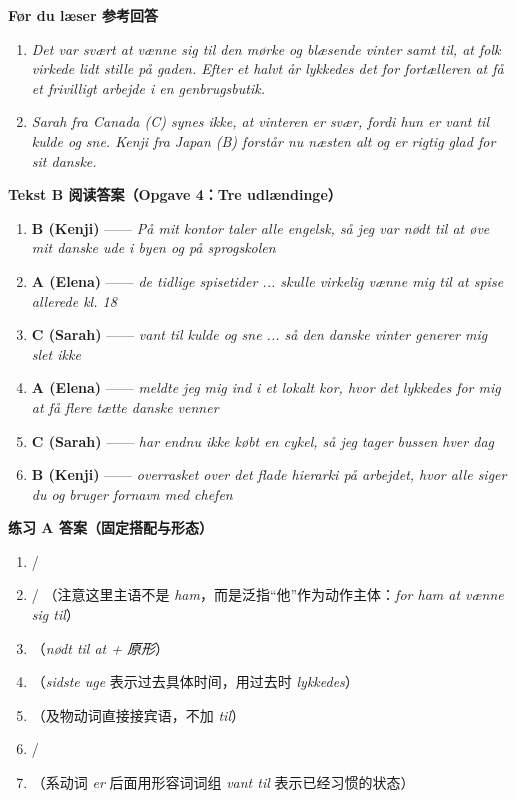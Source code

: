 \begin{answerbox}
\textbf{Før du læser 参考回答}
\begin{enumerate}
  \item \textit{Det var svært at vænne sig til den mørke og blæsende vinter samt til, at folk virkede lidt stille på gaden. Efter et halvt år lykkedes det for fortælleren at få et frivilligt arbejde i en genbrugsbutik.}
  \item \textit{Sarah fra Canada (C) synes ikke, at vinteren er svær, fordi hun er vant til kulde og sne. Kenji fra Japan (B) forstår nu næsten alt og er rigtig glad for sit danske.}
\end{enumerate}

\textbf{Tekst B 阅读答案（Opgave 4：Tre udlændinge）}
\begin{enumerate}
  \item \textbf{B (Kenji)} —— \textit{På mit kontor taler alle engelsk, så jeg var nødt til at øve mit danske ude i byen og på sprogskolen}
  \item \textbf{A (Elena)} —— \textit{de tidlige spisetider ... skulle virkelig vænne mig til at spise allerede kl. 18}
  \item \textbf{C (Sarah)} —— \textit{vant til kulde og sne ... så den danske vinter generer mig slet ikke}
  \item \textbf{A (Elena)} —— \textit{meldte jeg mig ind i et lokalt kor, hvor det lykkedes for mig at få flere tætte danske venner}
  \item \textbf{C (Sarah)} —— \textit{har endnu ikke købt en cykel, så jeg tager bussen hver dag}
  \item \textbf{B (Kenji)} —— \textit{overrasket over det flade hierarki på arbejdet, hvor alle siger du og bruger fornavn med chefen}
\end{enumerate}

\textbf{练习 A 答案（固定搭配与形态）}
\begin{enumerate}
  \item {} / 
  \item {} / （注意这里主语不是 \textit{ham}，而是泛指“他”作为动作主体：\textit{for ham at vænne sig til}）
  \item {}（\textit{nødt til at + 原形}）
  \item {}（\textit{sidste uge} 表示过去具体时间，用过去时 \textit{lykkedes}）
  \item {}（及物动词直接接宾语，不加 \textit{til}）
  \item {} / 
  \item {}（系动词 \textit{er} 后面用形容词词组 \textit{vant til} 表示已经习惯的状态）
\end{enumerate}


\end{answerbox}
